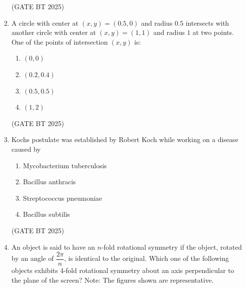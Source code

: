 \documentclass[journal,12pt,onecolumn]{IEEEtran}
\theoremstyle{remark}
\begin{document}
\begin{enumerate}
\hfill (GATE BT 2025)

\item A circle with center at $(x, y) = (0.5, 0)$ and radius $0.5$ intersects with another circle with center at $(x, y) = (1, 1)$ and radius $1$ at two points. One of the points of intersection $(x, y)$ is:  

\begin{enumerate}
    \item $(0, 0)$
    \item $(0.2, 0.4)$
    \item $(0.5, 0.5)$
    \item $(1, 2)$
\end{enumerate} 
\hfill (GATE BT 2025)

\item Kochs postulate was established by Robert Koch while working on a disease caused by  

\begin{enumerate}
    \item Mycobacterium tuberculosis
    \item Bacillus anthracis
    \item Streptococcus pneumoniae
    \item Bacillus subtilis
\end{enumerate}  
\hfill (GATE BT 2025)

\item An object is said to have an $n$-fold rotational symmetry if the object, rotated by an angle of $\dfrac{2\pi}{n}$, is identical to the original. Which one of the following objects exhibits 4-fold rotational symmetry about an axis perpendicular to the plane of the screen? {Note: The figures shown are representative.}


\end{enumerate}
\end{document}
